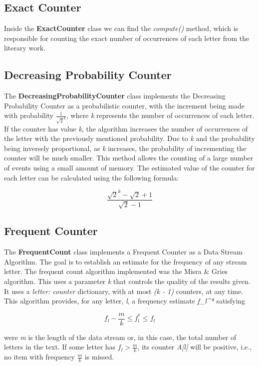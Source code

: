 \documentclass[...]{revdetua}
\begin{document}
\subsection{Exact Counter}

Inside the \textbf{ExactCounter} class we can find the \textit{compute()} method, which is responsible for counting the exact number of occurrences of each letter from the literary work.

\subsection{Decreasing Probability Counter}

The \textbf{DecreasingProbabilityCounter} class implements the Decreasing Probability Counter as a probabilistic counter, with the increment being made with probability \(\frac{1}{\sqrt{2}^k}\), where \textit{k} represents the number of occurrences of each letter. If the counter has value \textit{k}, the algorithm increases the number of occurrences of the letter with the previously mentioned probability. Due to \textit{k} and the probability being inversely proportional, as \textit{k} increases, the probability of incrementing the counter will be much smaller. This method allows the counting of a large number of events using a small amount of memory.
The estimated value of the counter
for each letter can be calculated using the following formula:

\[
\frac{\sqrt{2}^k - \sqrt{2} + 1}{\sqrt{2} - 1}
\]

\subsection{Frequent Counter}

The \textbf{FrequentCount} class implements a Frequent Counter as a Data Stream Algorithm. The goal is to establish an estimate for the frequency of any stream letter. The frequent count algorithm implemented was the Misra & Gries algorithm. This uses a parameter \textit{k} that controls the quality of the results given. It uses a \textit{{letter: counter}} dictionary, with at most \textit{(k - 1)} counters, at any time.
This algorithm provides, for any letter, \textit{l}, a frequency estimate \textit{f_{l}^*} satisfying

\[
f_l - \frac{m}{k} \leq f_{l}^* \leq f_l
\]

were \textit{m} is the length of the data stream or, in this case, the total number of letters in the text. If some letter has \(f_l > \frac{m}{k}\), its counter \textit{A[l]} will be positive, i.e., no item with frequency \(\frac{m}{k}\) is missed.
\end{document}
